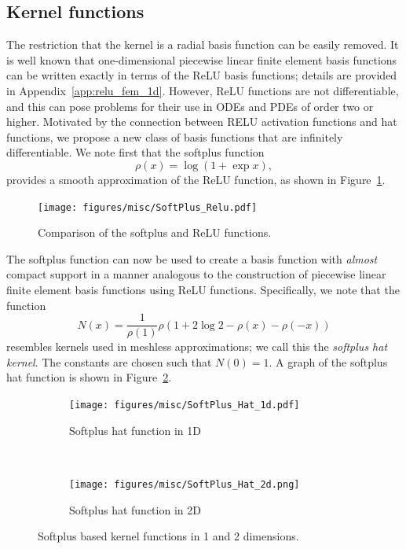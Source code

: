 \documentclass[12pt]{article}
\begin{document}
\subsection{Kernel functions}
The restriction that the kernel is a radial basis function can be easily removed. It is well known \cite{HLXZ2020} that one-dimensional piecewise linear finite element basis functions can be written exactly in terms of the ReLU basis functions; details are provided in Appendix~\ref{app:relu_fem_1d}. However, ReLU functions are not differentiable, and this can pose problems for their use in ODEs and PDEs of order two or higher. Motivated by the connection between RELU activation functions and hat functions, we propose a new class of basis functions that are infinitely differentiable. We note first that the softplus function
\begin{equation} \label{eq:softplus}
\rho(x) = \log (1 + \exp x),
\end{equation}
provides a smooth approximation of the ReLU function, as shown in Figure~\ref{fig:softplus_relu}.
\begin{figure}[htpb]
\centering
\texttt{[image: figures/misc/SoftPlus\_Relu.pdf]}
\caption{Comparison of the softplus and ReLU functions.}
\label{fig:softplus_relu}
\end{figure}
The softplus function can now be used to create a basis function with \emph{almost} compact support in a manner analogous to the construction of piecewise linear finite element basis functions using ReLU functions. Specifically, we note that the function
\begin{equation} \label{eq:hat_softplus_1d}
N(x) = \frac{1}{\rho(1)}\rho\left(1 + 2\log 2 - \rho(x) - \rho(-x)\right)
\end{equation}
resembles kernels used in meshless approximations; we call this the \emph{softplus hat kernel}. The constants are chosen such that $N(0) = 1$. A graph of the softplus hat function is shown in Figure~\ref{fig:softplus_hat_1d}.

\begin{figure}[htpb]
\begin{subfigure}{0.4\textwidth}
\centering
\texttt{[image: figures/misc/SoftPlus\_Hat\_1d.pdf]}
\caption{Softplus hat function in 1D}
\label{fig:softplus_hat_1d}
\end{subfigure}
~
\begin{subfigure}{0.6\textwidth}
\centering
\texttt{[image: figures/misc/SoftPlus\_Hat\_2d.png]}
\caption{Softplus hat function in 2D}
\label{fig:softplus_hat_2d}
\end{subfigure}
\caption{Softplus based kernel functions in 1 and 2 dimensions.}
\end{figure}
\end{document}
